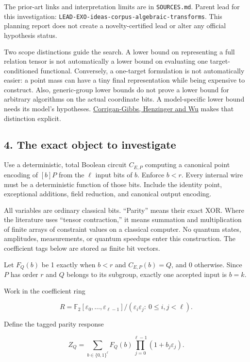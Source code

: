 \documentclass[
  10pt,
]{article}
\begin{document}
The prior-art links and interpretation limits are in
\texttt{SOURCES.md}. Parent lead for this investigation:
\texttt{LEAD-EXO-ideas-corpus-algebraic-transforms}. This planning
report does not create a novelty-certified lead or alter any official
hypothesis status.

Two scope distinctions guide the search. A lower bound on representing a
full relation tensor is not automatically a lower bound on evaluating
one target-conditioned functional. Conversely, a one-target formulation
is not automatically easier: a point mass can have a tiny final
representation while being expensive to construct. Also, generic-group
lower bounds do not prove a lower bound for arbitrary algorithms on the
actual coordinate bits. A model-specific lower bound needs its model's
hypotheses. \href{https://eprint.iacr.org/2026/384}{Corrigan-Gibbs,
Henzinger and Wu} makes that distinction explicit.

\subsection{4. The exact object to
investigate}\label{the-exact-object-to-investigate}

Use a deterministic, total Boolean circuit \(C_{E,P}\) computing a
canonical point encoding of \([b]P\) from the \(\ell\) input bits of
\(b\). Enforce \(b<r\). Every internal wire must be a deterministic
function of those bits. Include the identity point, exceptional
additions, field reduction, and canonical output encoding.

All variables are ordinary classical bits. ``Parity'' means their exact
XOR. Where the literature uses ``tensor contraction,'' it means
summation and multiplication of finite arrays of constraint values on a
classical computer. No quantum states, amplitudes, measurements, or
quantum speedups enter this construction. The coefficient tags below are
stored as finite bit vectors.

Let \(F_Q(b)\) be 1 exactly when \(b<r\) and \(C_{E,P}(b)=Q\), and 0
otherwise. Since \(P\) has order \(r\) and \(Q\) belongs to its
subgroup, exactly one accepted input is \(b=k\).

Work in the coefficient ring

\[
R=\mathbb F_2[\varepsilon_0,\ldots,\varepsilon_{\ell-1}]
  /(\varepsilon_i\varepsilon_j:\ 0\leq i,j<\ell).
\]

Define the tagged parity response

\[
Z_Q=\sum_{b\in\{0,1\}^{\ell}}F_Q(b)
             \prod_{j=0}^{\ell-1}(1+b_j\varepsilon_j).
\]
\end{document}
